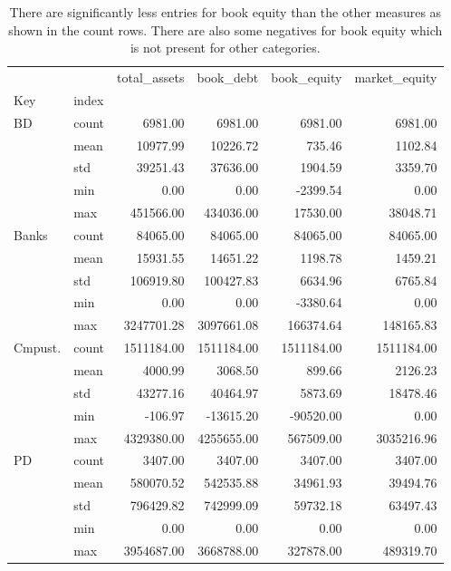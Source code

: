 \documentclass{article}
\begin{document}
\begin{adjustbox}{max width=\textwidth}
\begin{table}
\caption{There are significantly less entries for book equity than the other measures as shown in the count rows. There are also some negatives for book equity which is not present for other categories. }
\label{tab:Table 2.1}
\begin{tabular}{llrrrr}
\toprule
 &  & total_assets & book_debt & book_equity & market_equity \\
Key & index &  &  &  &  \\
\midrule
{BD} & count & 6981.00 & 6981.00 & 6981.00 & 6981.00 \\
 & mean & 10977.99 & 10226.72 & 735.46 & 1102.84 \\
 & std & 39251.43 & 37636.00 & 1904.59 & 3359.70 \\
 & min & 0.00 & 0.00 & -2399.54 & 0.00 \\
 & max & 451566.00 & 434036.00 & 17530.00 & 38048.71 \\
\cline{1-6}
{Banks} & count & 84065.00 & 84065.00 & 84065.00 & 84065.00 \\
 & mean & 15931.55 & 14651.22 & 1198.78 & 1459.21 \\
 & std & 106919.80 & 100427.83 & 6634.96 & 6765.84 \\
 & min & 0.00 & 0.00 & -3380.64 & 0.00 \\
 & max & 3247701.28 & 3097661.08 & 166374.64 & 148165.83 \\
\cline{1-6}
{Cmpust.} & count & 1511184.00 & 1511184.00 & 1511184.00 & 1511184.00 \\
 & mean & 4000.99 & 3068.50 & 899.66 & 2126.23 \\
 & std & 43277.16 & 40464.97 & 5873.69 & 18478.46 \\
 & min & -106.97 & -13615.20 & -90520.00 & 0.00 \\
 & max & 4329380.00 & 4255655.00 & 567509.00 & 3035216.96 \\
\cline{1-6}
{PD} & count & 3407.00 & 3407.00 & 3407.00 & 3407.00 \\
 & mean & 580070.52 & 542535.88 & 34961.93 & 39494.76 \\
 & std & 796429.82 & 742999.09 & 59732.18 & 63497.43 \\
 & min & 0.00 & 0.00 & 0.00 & 0.00 \\
 & max & 3954687.00 & 3668788.00 & 327878.00 & 489319.70 \\
\cline{1-6}
\bottomrule
\end{tabular}
\end{table}
\end{adjustbox}
\end{document}
